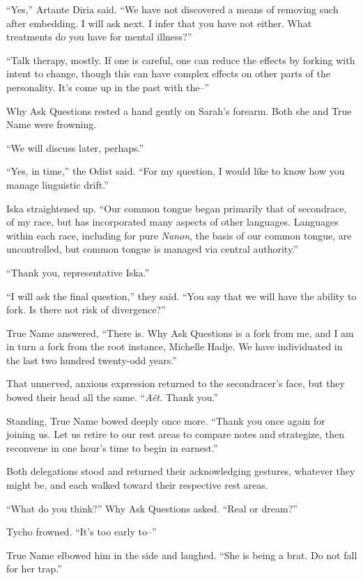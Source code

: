 ``Yes,'' Artante Diria said. ``We have not discovered a means of removing such after embedding. I will ask next. I infer that you have not either. What treatments do you have for mental illness?''

``Talk therapy, mostly. If one is careful, one can reduce the effects by forking with intent to change, though this can have complex effects on other parts of the personality. It's come up in the past with the--''

Why Ask Questions rested a hand gently on Sarah's forearm. Both she and True Name were frowning.

``We will discuss later, perhaps.''

``Yes, in time,'' the Odist said. ``For my question, I would like to know how you manage linguistic drift.''

Iska straightened up. ``Our common tongue began primarily that of secondrace, of my race, but has incorporated many aspects of other languages. Languages within each race, including for pure \emph{Nanon}, the basis of our common tongue, are uncontrolled, but common tongue is managed via central authority.''

``Thank you, representative Iska.''

``I will ask the final question,'' they said. ``You say that we will have the ability to fork. Is there not risk of divergence?''

True Name answered, ``There is. Why Ask Questions is a fork from me, and I am in turn a fork from the root instance, Michelle Hadje. We have individuated in the last two hundred twenty-odd years.''

That unnerved, anxious expression returned to the secondracer's face, but they bowed their head all the same. ``\emph{Aët.} Thank you.''

Standing, True Name bowed deeply once more. ``Thank you once again for joining us. Let us retire to our rest areas to compare notes and strategize, then reconvene in one hour's time to begin in earnest.''

Both delegations stood and returned their acknowledging gestures, whatever they might be, and each walked toward their respective rest areas.

``What do you think?'' Why Ask Questions asked. ``Real or dream?''

Tycho frowned. ``It's too early to--''

True Name elbowed him in the side and laughed. ``She is being a brat. Do not fall for her trap.''

